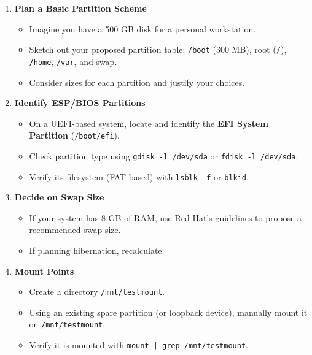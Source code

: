 \documentclass[12pt,a4paper]{report}
\begin{document}
\begin{enumerate}
    \item \textbf{Plan a Basic Partition Scheme}  
    \begin{itemize}
        \item Imagine you have a 500 GB disk for a personal workstation.  
        \item Sketch out your proposed partition table: \texttt{/boot} (300 MB), root (\texttt{/}), \texttt{/home}, \texttt{/var}, and swap.  
        \item Consider sizes for each partition and justify your choices.
    \end{itemize}

    \item \textbf{Identify ESP/BIOS Partitions}  
    \begin{itemize}
        \item On a UEFI-based system, locate and identify the \textbf{EFI System Partition} (\texttt{/boot/efi}).  
        \item Check partition type using \texttt{gdisk -l /dev/sda} or \texttt{fdisk -l /dev/sda}.  
        \item Verify its filesystem (FAT-based) with \texttt{lsblk -f} or \texttt{blkid}.
    \end{itemize}

    \item \textbf{Decide on Swap Size}  
    \begin{itemize}
        \item If your system has 8 GB of RAM, use Red Hat’s guidelines to propose a recommended swap size.  
        \item If planning hibernation, recalculate.
    \end{itemize}

    \item \textbf{Mount Points}  
    \begin{itemize}
        \item Create a directory \texttt{/mnt/testmount}.  
        \item Using an existing spare partition (or loopback device), manually mount it on \texttt{/mnt/testmount}.  
        \item Verify it is mounted with \texttt{mount | grep /mnt/testmount}.
    \end{itemize}


\end{enumerate}
\end{document}
